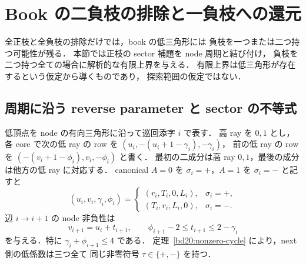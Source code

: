 \section{Book の二負枝の排除と一負枝への還元}
\label{bn21:section}

全正枝と全負枝の排除だけでは，book の低三角形には
負枝を一つまたは二つ持つ可能性が残る．
本節では正枝の sector 補題を node 周期と結び付け，
負枝を二つ持つ全ての場合に解析的な有限上界を与える．
有限上界は低三角形が存在するという仮定から導くものであり，
探索範囲の仮定ではない．

\subsection{周期に沿う reverse parameter と sector の不等式}

低頂点を node の有向三角形に沿って巡回添字 $i$ で表す．
高 ray を $0,1$ とし，各 core で次の低 ray の row を
$(u_i,-(u_i+1-\gamma_i),-\gamma_i)$，
前の低 ray の row を $(-(v_i+1-\phi_i),v_i,-\phi_i)$ と書く．
最初の二成分は高 ray $0,1$，最後の成分は他方の低 ray に対応する．
canonical $A=0$ を $\sigma_i=+$，$A=1$ を $\sigma_i=-$ と記すと
\begin{equation}\label{bn21:node-orientation}
 (u_i,v_i,\gamma_i,\phi_i)=
 \begin{cases}
 (r_i,T_i,0,L_i),&\sigma_i=+,\\
 (T_i,r_i,L_i,0),&\sigma_i=-.
 \end{cases}
\end{equation}
辺 $i\to i+1$ の node 非負性は
\begin{equation}\label{bn21:offset}
 v_{i+1}=u_i+t_{i+1},\qquad
 \phi_{i+1}-2\le t_{i+1}\le2-\gamma_i
\end{equation}
を与える．特に $\gamma_i+\phi_{i+1}\le4$ である．
定理~\ref{bd20:nonzero-cycle} により，next 側の低係数は三つ全て
同じ非零符号 $\tau\in\{+,-\}$ を持つ．

